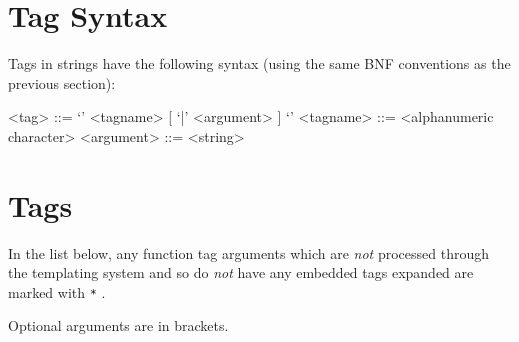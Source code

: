 \section{Tag Syntax}
\label{reftagsyn}
Tags in strings have the following syntax (using the same BNF conventions as the previous section):
\begin{MyVerbatim}
<tag> ::= `{' <tagname> [{ `|' <argument> }] `}'
<tagname> ::= {<alphanumeric character>}
<argument> ::= <string>
\end{MyVerbatim}

\section{Tags}
In the list below, any function tag arguments which are \emph{not} processed
through the templating system and so do \emph{not} have any embedded
tags expanded are marked with \verb+*+ .

Optional arguments are in brackets.

\scriptsize
\clearpage
\printglossary
\clearpage
{}
